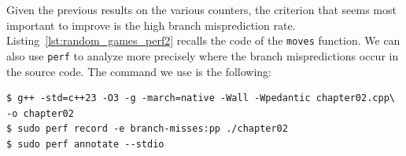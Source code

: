 \documentclass[12pt,a4paper,twoside,openright]{book}
\begin{document}
Given the previous results on the various counters, the criterion that seems most important to improve is the high branch misprediction rate. Listing~\ref{lst:random_games_perf2} recalls the code of the \texttt{moves} function. We can also use \texttt{perf} to analyze more precisely where the branch mispredictions occur in the source code. The command we use is the following:

\begin{mdframed}[skipabove=\baselineskip,skipbelow=0pt,hidealllines=true,backgroundcolor=black!3,innerleftmargin=10pt,innerrightmargin=5pt,innertopmargin=0pt,innerbottommargin=5pt]
{\small
\begin{verbatim}
$ g++ -std=c++23 -O3 -g -march=native -Wall -Wpedantic chapter02.cpp\
-o chapter02
$ sudo perf record -e branch-misses:pp ./chapter02
$ sudo perf annotate --stdio
\end{verbatim}
}
\end{mdframed}

\end{document}
